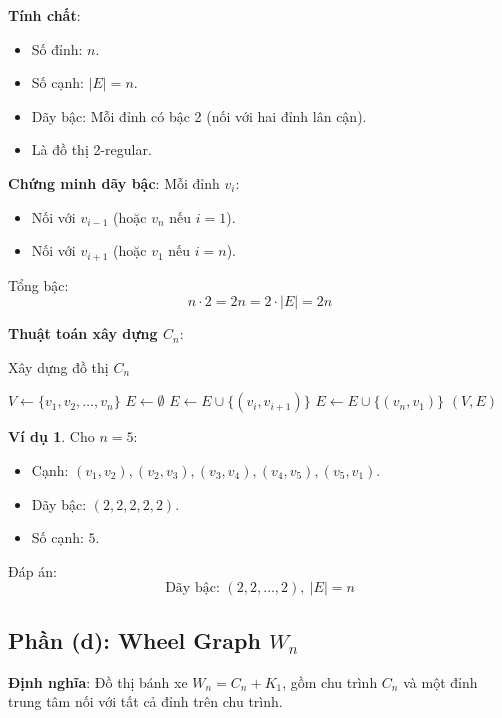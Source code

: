 \documentclass[a4paper,12pt]{article}
\theoremstyle{plain}
\theoremstyle{definition}
\newtheorem{example}{Ví dụ}
\begin{document}
\textbf{Tính chất}:
\begin{itemize}
    \item Số đỉnh: \( n \).
    \item Số cạnh: \( |E| = n \).
    \item Dãy bậc: Mỗi đỉnh có bậc 2 (nối với hai đỉnh lân cận).
    \item Là đồ thị 2-regular.
\end{itemize}

\textbf{Chứng minh dãy bậc}:
Mỗi đỉnh \( v_i \):
\begin{itemize}
    \item Nối với \( v_{i-1} \) (hoặc \( v_n \) nếu \( i=1 \)).
    \item Nối với \( v_{i+1} \) (hoặc \( v_1 \) nếu \( i=n \)).
\end{itemize}
Tổng bậc:
\[
n \cdot 2 = 2n = 2 \cdot |E| = 2n
\]

\textbf{Thuật toán xây dựng \( C_n \)}:
\begin{algorithm}
\caption{Xây dựng đồ thị \( C_n \)}
\begin{algorithmic}
    \State $V \gets \{v_1, v_2, \ldots, v_n\}$
    \State $E \gets \emptyset$
        \State $E \gets E \cup \{(v_i, v_{i+1})\}$
    \EndFor
    \State $E \gets E \cup \{(v_n, v_1)\}$
    \State \Return $(V, E)$
\EndFunction
\end{algorithmic}
\end{algorithm}

\begin{example}
Cho \( n=5 \):
\begin{itemize}
    \item Cạnh: \( (v_1, v_2), (v_2, v_3), (v_3, v_4), (v_4, v_5), (v_5, v_1) \).
    \item Dãy bậc: \( (2, 2, 2, 2, 2) \).
    \item Số cạnh: \( 5 \).
\end{itemize}
\end{example}

Đáp án:
\[
\boxed{\text{Dãy bậc: } (2, 2, \ldots, 2), \ |E| = n}
\]

\subsection*{Phần (d): Wheel Graph \( W_n \)}

\textbf{Định nghĩa}: Đồ thị bánh xe \( W_n = C_n + K_1 \), gồm chu trình \( C_n \) và một đỉnh trung tâm nối với tất cả đỉnh trên chu trình.
\end{document}

